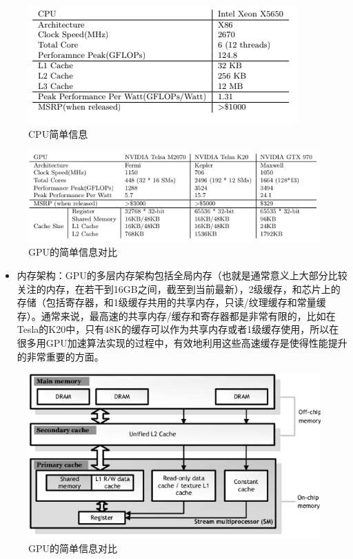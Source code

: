 \begin{figure}
\centering
\includegraphics{./img/ch15/cpu_specs.png}
\caption{CPU简单信息}
\end{figure}

\begin{figure}
\centering
\includegraphics{./img/ch15/gpu_specs.png}
\caption{GPU的简单信息对比}
\end{figure}

\begin{itemize}
\item
  内存架构：GPU的多层内存架构包括全局内存（也就是通常意义上大部分比较关注的内存，在若干到16GB之间，截至到当前最新），2级缓存，和芯片上的存储（包括寄存器，和1级缓存共用的共享内存，只读/纹理缓存和常量缓存）。通常来说，最高速的共享内存/缓存和寄存器都是非常有限的，比如在Tesla的K20中，只有48K的缓存可以作为共享内存或者1级缓存使用，所以在很多用GPU加速算法实现的过程中，有效地利用这些高速缓存是使得性能提升的非常重要的方面。
\end{itemize}

\begin{figure}
\centering
\includegraphics{./img/ch15/gpu_memory_arch.png}
\caption{GPU的简单信息对比}
\end{figure}

